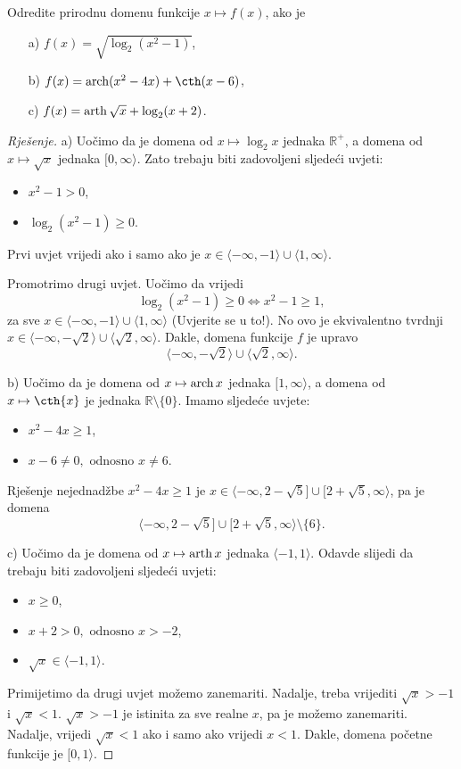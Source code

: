 \begin{exercise}
Odredite prirodnu domenu funkcije $x\mapsto f(x)$, ako je
\begin{itemize}
\item[a)] $f(x)=\sqrt{\log_2(x^2-1)}$,
\item[b)] $f(x)=\arcosh(x^2-4x)+\cth(x-6)$,
\item[c)] $f(x)=\operatorname{arth}{\sqrt{x}}+\log_2(x+2)$.
\end{itemize}
\end{exercise}
\begin{proof}[Rješenje]
a) Uočimo da je domena od $x\mapsto \log_2{x}$ jednaka $\mathbb{R}^+$, a domena od $x\mapsto \sqrt{x}$ jednaka $[0, \infty\rangle$. Zato trebaju biti zadovoljeni sljedeći uvjeti:
\begin{itemize}
\item $x^2-1>0$,
\item $\log_2(x^2-1)\geq 0$.
\end{itemize}
Prvi uvjet vrijedi ako i samo ako je $x\in \langle-\infty, -1\rangle\cup \langle 1, \infty\rangle$.

Promotrimo drugi uvjet. Uočimo da vrijedi $$\log_2(x^2-1)\geq 0\Leftrightarrow x^2-1\geq 1,$$
za sve $x\in \langle-\infty, -1\rangle\cup \langle 1, \infty\rangle$ (Uvjerite se u to!). No ovo je ekvivalentno tvrdnji $x\in \langle-\infty, -\sqrt{2}\rangle\cup \langle \sqrt{2}, \infty\rangle$. Dakle, domena funkcije $f$ je upravo $$\langle-\infty, -\sqrt{2}\rangle\cup \langle \sqrt{2}, \infty\rangle.$$

b) Uočimo da je domena od $x\mapsto \operatorname{arch}{x}$ jednaka $[1, \infty\rangle$, a domena od $x\mapsto \cth{x}$ je jednaka $\mathbb{R}\setminus\{0\}$. Imamo sljedeće uvjete:
\begin{itemize}
\item $x^2-4x\geq 1$,
\item $x-6\neq 0,\text{ odnosno } x\neq 6$.
\end{itemize}
Rješenje nejednadžbe $x^2-4x\geq 1$ je $x\in \langle -\infty, 2-\sqrt{5}]\cup [2+\sqrt{5}, \infty\rangle$, pa je domena
$$\langle -\infty, 2-\sqrt{5}]\cup [2+\sqrt{5}, \infty\rangle\setminus\{6\}.$$

c) Uočimo da je domena od $x\mapsto \operatorname{arth}{x}$ jednaka $\langle -1, 1\rangle$. Odavde slijedi da trebaju biti zadovoljeni sljedeći uvjeti:
\begin{itemize}
\item $x\geq 0$,
\item $x+2>0,\text{ odnosno }x>-2$,
\item $\sqrt{x}\in \langle -1, 1\rangle$.
\end{itemize}
Primijetimo da drugi uvjet možemo zanemariti. Nadalje, treba vrijediti $\sqrt{x}>-1$ i $\sqrt{x}<1$. $\sqrt{x}>-1$ je istinita za sve realne $x$, pa je možemo zanemariti. Nadalje, vrijedi $\sqrt{x}<1$ ako i samo ako vrijedi $ x<1$. Dakle, domena početne funkcije je $[0, 1\rangle$.
\end{proof}
